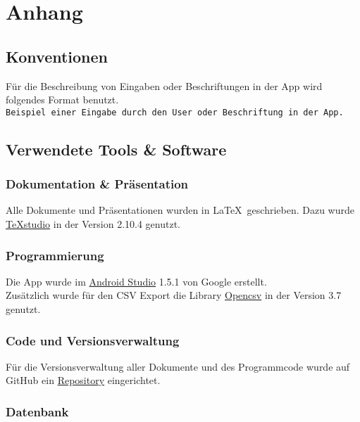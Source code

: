 \chapter{Anhang}

\section{Konventionen}

Für die Beschreibung von Eingaben oder Beschriftungen in der App wird folgendes Format benutzt. \\
{\color{IndianRed}\texttt{Beispiel einer Eingabe durch den User oder Beschriftung in der App.}}

\section{Verwendete Tools \& Software}

\subsection{Dokumentation \& Präsentation}

Alle Dokumente und Präsentationen wurden in \LaTeX \ geschrieben. Dazu wurde \href{http://texstudio.sourceforge.net}{TeXstudio} in der Version 2.10.4 genutzt. 

\subsection{Programmierung}

Die App wurde im \href{https://developer.android.com/studio/index.html}{Android Studio} 1.5.1 von Google erstellt.\\
Zusätzlich wurde für den CSV Export die Library \href{http://opencsv.sourceforge.net/}{Opencsv} in der Version 3.7 genutzt.

\subsection{Code und Versionsverwaltung}

Für die Versionsverwaltung aller Dokumente und des Programmcode wurde auf GitHub ein \href{https://github.com/MWeigert/Collector}{Repository} eingerichtet.

\subsection{Datenbank}

